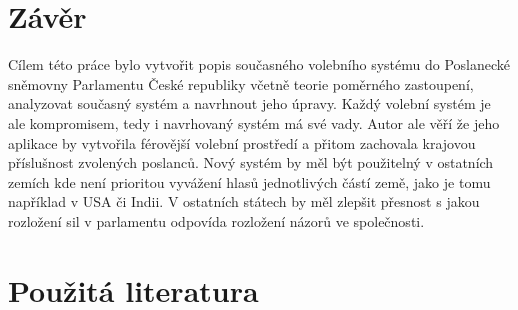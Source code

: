 \documentclass[12pt]{report}
\begin{document}
\section{Závěr} 
Cílem této práce bylo vytvořit popis současného volebního systému do Poslanecké sněmovny Parlamentu České republiky včetně teorie poměrného zastoupení, analyzovat současný systém a navrhnout jeho úpravy.
Každý volební systém je ale kompromisem, tedy i navrhovaný systém má své vady.
Autor ale věří že jeho aplikace by vytvořila férovější volební prostředí a přitom zachovala krajovou příslušnost zvolených poslanců.
Nový systém by měl být použitelný v ostatních zemích kde není prioritou vyvážení hlasů jednotlivých částí země, jako je tomu například v USA či Indii.
V ostatních státech by měl zlepšit přesnost s jakou rozložení sil v parlamentu odpovída rozložení názorů ve společnosti.
\section*{Použitá literatura} \printbibliography[heading=none] 
\end{document}
